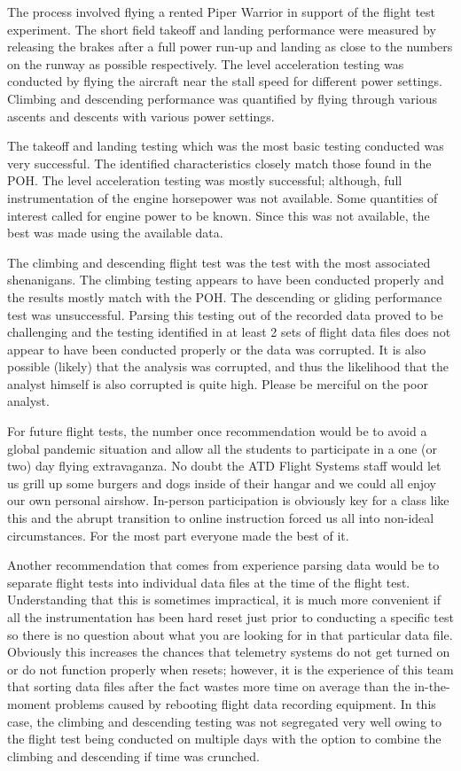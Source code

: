 \documentclass[conf]{new-aiaa}
\begin{document}
The process involved flying a rented Piper Warrior in support of the flight test experiment. The short field takeoff and landing performance were measured by releasing the brakes after a full power run-up and landing as close to the numbers on the runway as possible respectively. The level acceleration testing was conducted by flying the aircraft near the stall speed for different power settings. Climbing and descending performance was quantified by flying through various ascents and descents with various power settings.

The takeoff and landing testing which was the most basic testing conducted was very successful. The identified characteristics closely match those found in the POH. The level acceleration testing was mostly successful; although, full instrumentation of the engine horsepower was not available. Some quantities of interest called for engine power to be known. Since this was not available, the best was made using the available data.

The climbing and descending flight test was the test with the most associated shenanigans. The climbing testing appears to have been conducted properly and the results mostly match with the POH. The descending or gliding performance test was unsuccessful. Parsing this testing out of the recorded data proved to be challenging and the testing identified in at least 2 sets of flight data files does not appear to have been conducted properly or the data was corrupted. It is also possible (likely) that the analysis was corrupted, and thus the likelihood that the analyst himself is also corrupted is quite high. Please be merciful on the poor analyst.

For future flight tests, the number once recommendation would be to avoid a global pandemic situation and allow all the students to participate in a one (or two) day flying extravaganza. No doubt the ATD Flight Systems staff would let us grill up some burgers and dogs inside of their hangar and we could all enjoy our own personal airshow. In-person participation is obviously key for a class like this and the abrupt transition to online instruction forced us all into non-ideal circumstances. For the most part everyone made the best of it.

Another recommendation that comes from experience parsing data would be to separate flight tests into individual data files at the time of the flight test. Understanding that this is sometimes impractical, it is much more convenient if all the instrumentation has been hard reset just prior to conducting a specific test so there is no question about what you are looking for in that particular data file. Obviously this increases the chances that telemetry systems do not get turned on or do not function properly when resets; however, it is the experience of this team that sorting data files after the fact wastes more time on average than the in-the-moment problems caused by rebooting flight data recording equipment. In this case, the climbing and descending testing was not segregated very well owing to the flight test being conducted on multiple days with the option to combine the climbing and descending if time was crunched.
\end{document}
